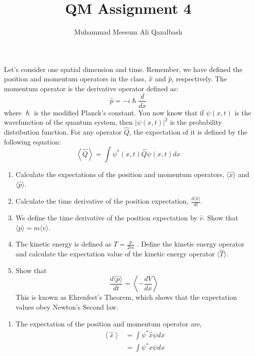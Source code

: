 \documentclass[addpoints]{exam}
\title{QM Assignment 4}
\author{Muhammad Meesum Ali Qazalbash}
\theoremstyle{mytheoremstyle}
\theoremstyle{mytheoremstyle}
\theoremstyle{myproblemstyle}
\begin{document}
\maketitle

\begin{questions}
	\question[15] Let's consider one spatial dimension and time. Remember, we have defined the position and momentum operators in the class, \(\hat{x}\) and \(\hat{p}\), respectively. The momentum operator is the derivative operator defined as:
	\[\hat{p}=-i\hslash\frac{d}{dx}\]
	where \(\hslash\) is the modified Planck's constant. You now know that if \(\psi(x, t)\) is the wavefunction of the quantum system, then \(|\psi(x, t)|^2\) is the probability distribution function. For any operator \(\hat{Q}\), the expectation of it is defined by the following equation:
	\[\left\langle\hat{Q}\right\rangle = \int \psi^{*}(x,t)\hat{Q}\psi(x,t)dx\]
	\begin{enumerate}
		\item Calculate the expectations of the position and momentum operators, \(\langle\hat{x}\rangle\) and \(\langle\hat{p}\rangle\).
		\item Calculate the time derivative of the position expectation, \(\displaystyle\frac{d\langle\hat{x}\rangle}{dt}\).
		\item We define the time derivative of the position expectation by \(\hat{v}\). Show that \(\langle p\rangle = m\langle v\rangle\).
		\item The kinetic energy is defined as \(\displaystyle T = \frac{p}{2m}\) . Define the kinetic energy operator and calculate the expectation value of the kinetic energy operator \(\langle\hat{T}\rangle\).
		\item Show that \[\frac{d\langle\hat{p}\rangle}{dt}=\left\langle-\frac{dV}{dx}\right\rangle\] This is known as Ehrenfest's Theorem, which shows that the expectation values obey Newton's Second law.
	\end{enumerate}
	\begin{solution}
		\begin{enumerate}
			\item The expectation of the position and momentum operator are,
			      \begin{equation*}
				      \begin{aligned}
					      \left\langle\hat{x}\right\rangle & = \int \psi^{*}\hat{x}\psi dx      \\
					                                       & = \int \psi^{*}x\psi       dx      \\

\end{aligned}
\end{equation*}
\end{enumerate}
\end{solution}
\end{questions}
\end{document}
